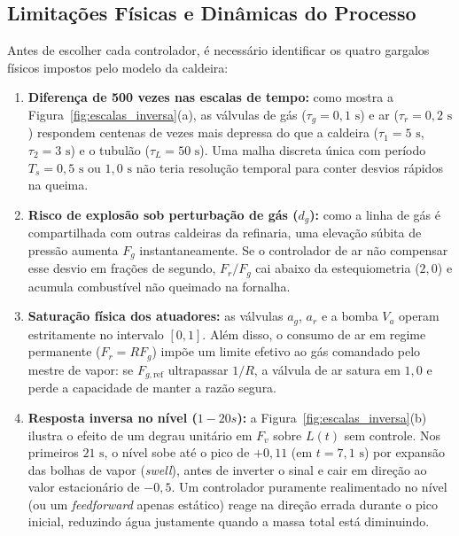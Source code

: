 \documentclass[12pt,a4paper]{article}
\begin{document}
\subsection{Limita\c{c}\~oes F\'isicas e Din\^amicas do Processo}
Antes de escolher cada controlador, \'e necess\'ario identificar os quatro gargalos f\'isicos impostos pelo modelo da caldeira:

\begin{enumerate}
    \item \textbf{Diferen\c{c}a de 500 vezes nas escalas de tempo:} como mostra a Figura~\ref{fig:escalas_inversa}(a), as v\'alvulas de g\'as ($\tau_g = 0{,}1\text{ s}$) e ar ($\tau_r = 0{,}2\text{ s}$) respondem centenas de vezes mais depressa do que a caldeira ($\tau_1 = 5\text{ s}$, $\tau_2 = 3\text{ s}$) e o tubul\~ao ($\tau_L = 50\text{ s}$). Uma malha discreta \'unica com per\'iodo $T_s = 0{,}5\text{ s}$ ou $1{,}0\text{ s}$ n\~ao teria resolu\c{c}\~ao temporal para conter desvios r\'apidos na queima.
    \item \textbf{Risco de explos\~ao sob perturba\c{c}\~ao de g\'as ($d_g$):} como a linha de g\'as \'e compartilhada com outras caldeiras da refinaria, uma eleva\c{c}\~ao s\'ubita de press\~ao aumenta $F_g$ instantaneamente. Se o controlador de ar n\~ao compensar esse desvio em fra\c{c}\~oes de segundo, $F_r/F_g$ cai abaixo da estequiometria ($2{,}0$) e acumula combust\'ivel n\~ao queimado na fornalha.
    \item \textbf{Satura\c{c}\~ao f\'isica dos atuadores:} as v\'alvulas $a_g$, $a_r$ e a bomba $V_a$ operam estritamente no intervalo $[0, 1]$. Al\'em disso, o consumo de ar em regime permanente ($F_r = R F_g$) imp\~oe um limite efetivo ao g\'as comandado pelo mestre de vapor: se $F_{g,\text{ref}}$ ultrapassar $1 / R$, a v\'alvula de ar satura em $1{,}0$ e perde a capacidade de manter a raz\~ao segura.
    \item \textbf{Resposta inversa no n\'ivel ($1 - 20s$):} a Figura~\ref{fig:escalas_inversa}(b) ilustra o efeito de um degrau unit\'ario em $F_v$ sobre $L(t)$ sem controle. Nos primeiros $21\text{ s}$, o n\'ivel sobe at\'e o pico de $+0{,}11$ (em $t = 7{,}1\text{ s}$) por expans\~ao das bolhas de vapor (\textit{swell}), antes de inverter o sinal e cair em dire\c{c}\~ao ao valor estacion\'ario de $-0{,}5$. Um controlador puramente realimentado no n\'ivel (ou um \textit{feedforward} apenas est\'atico) reage na dire\c{c}\~ao errada durante o pico inicial, reduzindo \'agua justamente quando a massa total est\'a diminuindo.
\end{enumerate}
\end{document}
